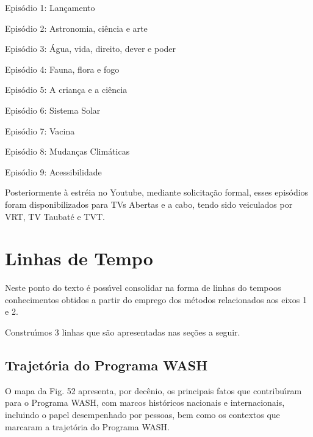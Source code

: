 \documentclass[
12pt,		%
openright,	%
twoside,  %
a4paper,			%
chapter=TITLE,		%
english,			%
french,				%
spanish,			%
brazil				%
]{USPSC-classe/USPSC}
\begin{document}
\begin{alineas}
\item Epis\'odio 1: Lan\c{c}amento
\item Epis\'odio 2: Astronomia, ci\^encia e arte
\item Epis\'odio 3: \'Agua, vida, direito, dever e poder
\item Epis\'odio 4: Fauna, flora e fogo
\item Epis\'odio 5: A crian\c{c}a e a ci\^encia
\item Epis\'odio 6: Sistema Solar
\item Epis\'odio 7: Vacina
\item Epis\'odio 8: Mudan\c{c}as Clim\'aticas
\item Epis\'odio 9: Acessibilidade
\end{alineas}

Posteriormente \`a estr\'eia no Youtube, mediante solicita\c{c}\~ao formal, esses epis\'odios foram disponibilizados para TVs Abertas e \textquotedbl a cabo\textquotedbl , tendo sido veiculados por VRT, TV Taubat\'e e TVT.









\section[Linhas de Tempo]{Linhas de Tempo}\label{Linhas de Tempo}
Neste ponto do texto \'e poss\'{\i}vel consolidar na forma de \textquotedbl linhas do tempo\textquotedbl  os conhecimentos obtidos a partir do emprego dos m\'etodos relacionados aos eixos 1 e 2.









Constru\'{\i}mos 3 linhas que s\~ao apresentadas nas se\c{c}\~oes a seguir.









\subsection[Trajet\'oria do Programa WASH]{Trajet\'oria do Programa WASH}\label{Trajet\'oria do Programa WASH}
O mapa da Fig. 52 apresenta, por dec\^enio, os principais fatos que contribu\'{\i}ram para o Programa WASH, com marcos hist\'oricos nacionais e internacionais, incluindo o papel desempenhado por pessoas, bem como os contextos que marcaram a trajet\'oria do Programa WASH.
\end{document}

